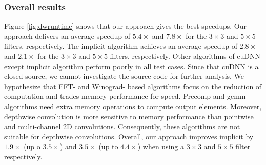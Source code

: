 \subsubsection{Overall results}
Figure \ref{fig:dwruntime} shows that our approach gives the best speedups. 
Our approach delivers an average speedup of $5.4\times$ and $7.8\times$ for the $3 \times 3$ and $5 \times 5$ filters, respectively. 
The implicit algorithm achieves an average speedup of $2.8\times$ and $2.1\times$ for the $3 \times 3$ and $5 \times 5$ filters, respectively.
Other algorithms of cuDNN except implicit algorithm perform poorly in all test cases. 
Since that cuDNN is a closed source, we cannot investigate the source code for further analysis. 
We hypothesize that FFT- and Winograd- based algorithms focus on the reduction of computation and trades memory performance for speed. 
Precomp and gemm algorithms need extra memory operations to compute output elements. 
Moreover, depthwise convolution is more sensitive to memory performance than pointwise and multi-channel 2D convolutions. 
Consequently, these algorithms are not suitable for depthwise convolutions. 
Overall, our approach improves implicit by $1.9\times$ (up o $3.5\times$) and $3.5\times$ (up to $4.4\times$) when using a $3 \times 3$ and $5 \times 5$ filter respectively.
